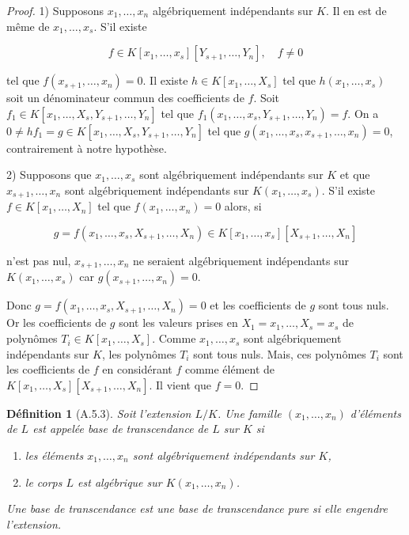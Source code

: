 \documentclass[12pts,a4paper]{report}
\newtheorem{definition}{Définition}
\begin{document}
\begin{proof}
1) Supposons \( x_1, \ldots, x_n \) algébriquement indépendants sur \( K \). Il en est de même de \( x_1, \ldots, x_s \). S'il existe

\[
f \in K[x_1, \ldots, x_s][Y_{s+1}, \ldots, Y_n], \quad f \neq 0
\]

tel que \( f(x_{s+1}, \ldots, x_n) = 0 \). Il existe \( h \in K[x_1, \ldots, X_s] \) tel que \( h(x_1, \ldots, x_s) \) soit un dénominateur commun des coefficients de \( f \). Soit \( f_1 \in K[x_1, \ldots, X_s, Y_{s+1}, \ldots, Y_n] \) tel que \( f_1(x_1, \ldots, x_s, Y_{s+1}, \ldots, Y_n) = f \). On a \( 0 \neq hf_1 = g \in K[x_1, \ldots, X_s, Y_{s+1}, \ldots, Y_n] \) tel que \( g(x_1, \ldots, x_s, x_{s+1}, \ldots, x_n) = 0 \), contrairement à notre hypothèse.

2) Supposons que \( x_1, \ldots, x_s \) sont algébriquement indépendants sur \( K \) et que \( x_{s+1}, \ldots, x_n \) sont algébriquement indépendants sur \( K(x_1, \ldots, x_s) \). S'il existe \( f \in K[x_1, \ldots, X_n] \) tel que \( f(x_1, \ldots, x_n) = 0 \) alors, si

\[
g = f(x_1, \ldots, x_s, X_{s+1}, \ldots, X_n) \in K[x_1, \ldots, x_s][X_{s+1}, \ldots, X_n]
\]

n'est pas nul, \( x_{s+1}, \ldots, x_n \) ne seraient algébriquement indépendants sur \( K(x_1, \ldots, x_s) \) car \( g(x_{s+1}, \ldots, x_n) = 0 \).

Donc \( g = f(x_1, \ldots, x_s, X_{s+1}, \ldots, X_n) = 0 \) et les coefficients de \( g \) sont tous nuls. Or les coefficients de \( g \) sont les valeurs prises en \( X_1 = x_1, \ldots, X_s = x_s \) de polynômes \( T_i \in K[x_1, \ldots, X_s] \). Comme \( x_1, \ldots, x_s \) sont algébriquement indépendants sur \( K \), les polynômes \( T_i \) sont tous nuls. Mais, ces polynômes \( T_i \) sont les coefficients de \( f \) en considérant \( f \) comme élément de \( K[x_1, \ldots, X_s][X_{s+1}, \ldots, X_n] \). Il vient que \( f = 0 \). \qedhere
\end{proof}

\begin{definition}[A.5.3]
Soit l'extension \( L/K \). Une famille \( (x_1, \ldots, x_n) \) d'éléments de \( L \) est appelée base de transcendance de \( L \) sur \( K \) si
\begin{enumerate}[label=(\alph*)]
\item les éléments \( x_1, \ldots, x_n \) sont algébriquement indépendants sur \( K \),
\item le corps \( L \) est algébrique sur \( K(x_1, \ldots, x_n) \).
\end{enumerate}

Une base de transcendance est une base de transcendance pure si elle engendre l'extension.
\end{definition}
\end{document}
